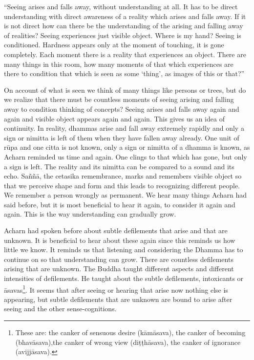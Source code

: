 ``Seeing arises and falls away, without understanding at all. It has to
be direct understanding with direct awareness of a reality which arises
and falls away. If it is not direct how can there be the understanding
of the arising and falling away of realities? Seeing experiences just
visible object. Where is my hand? Seeing is conditioned. Hardness
appears only at the moment of touching, it is gone completely. Each
moment there is a reality that experiences an object. There are many
things in this room, how many moments of that which experiences are
there to condition that which is seen as some `thing', as images of this
or that?''

On account of what is seen we think of many things like persons or
trees, but do we realize that there must be countless moments of seeing
arising and falling away to condition thinking of concepts? Seeing
arises and falls away again and again and visible object appears again
and again. This gives us an idea of continuity. In reality, dhammas
arise and fall away extremely rapidly and only a sign or nimitta is left
of them when they have fallen away already. One unit of rūpa and one
citta is not known, only a sign or nimitta of a dhamma is known, as
Acharn reminded us time and again. One clings to that which has gone,
but only a sign is left. The reality and its nimitta can be compared to
a sound and its echo. Saññā, the cetasika remembrance, marks and
remembers visible object so that we perceive shape and form and this
leads to recognizing different people. We remember a person wrongly as
permanent. We hear many things Acharn had said before, but it is most
beneficial to hear it again, to consider it again and again. This is the
way understanding can gradually grow.

Acharn had spoken before about subtle defilements that arise and that
are unknown. It is beneficial to hear about these again since this
reminds us how little we know. It reminds us that listening and
considering the Dhamma has to continue on so that understanding can
grow. There are countless defilements arising that are unknown. The
Buddha taught different aspects and different intensities of
defilements. He taught about the subtle defilements, intoxicants or
āsavas\footnote{These are: the canker of
sensuous desire (kāmāsava), the canker of becoming (bhavāsava),the
canker of wrong view (diṭṭhāsava), the canker of ignorance (avijjāsava).}. It seems that
after seeing or hearing that arise now nothing else is appearing, but
subtle defilements that are unknown are bound to arise after seeing and
the other sense-cognitions.

